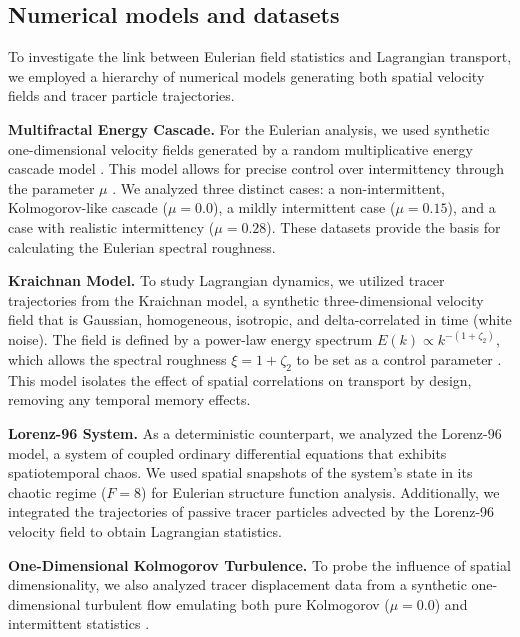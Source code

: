 \documentclass[]{article}
\begin{document}
\subsection{Numerical models and datasets}
To investigate the link between Eulerian field statistics and Lagrangian transport, we employed a hierarchy of numerical models generating both spatial velocity fields and tracer particle trajectories.

\noindent\textbf{Multifractal Energy Cascade.} For the Eulerian analysis, we used synthetic one-dimensional velocity fields generated by a random multiplicative energy cascade model \citep{shivamoggi2022generalizedfractaldimensiondissipative}. This model allows for precise control over intermittency through the parameter $\mu$ \citep{arreola2024currentstateatmosphericturbulence}. We analyzed three distinct cases: a non-intermittent, Kolmogorov-like cascade ($\mu=0.0$), a mildly intermittent case ($\mu=0.15$), and a case with realistic intermittency ($\mu=0.28$). These datasets provide the basis for calculating the Eulerian spectral roughness.

\noindent\textbf{Kraichnan Model.} To study Lagrangian dynamics, we utilized tracer trajectories from the Kraichnan model, a synthetic three-dimensional velocity field that is Gaussian, homogeneous, isotropic, and delta-correlated in time (white noise). The field is defined by a power-law energy spectrum $E(k) \propto k^{-(1+\zeta_2)}$, which allows the spectral roughness $\xi = 1 + \zeta_2$ to be set as a control parameter \citep{considera2025transportmultifractalkraichnanflows}. This model isolates the effect of spatial correlations on transport by design, removing any temporal memory effects.

\noindent\textbf{Lorenz-96 System.} As a deterministic counterpart, we analyzed the Lorenz-96 model, a system of coupled ordinary differential equations that exhibits spatiotemporal chaos. We used spatial snapshots of the system's state in its chaotic regime ($F=8$) for Eulerian structure function analysis. Additionally, we integrated the trajectories of passive tracer particles advected by the Lorenz-96 velocity field to obtain Lagrangian statistics.

\noindent\textbf{One-Dimensional Kolmogorov Turbulence.} To probe the influence of spatial dimensionality, we also analyzed tracer displacement data from a synthetic one-dimensional turbulent flow \citep{benzi199611dimensionalturbulence,kuksin2021kolmogorovstheoryturbulencerigorous} emulating both pure Kolmogorov ($\mu=0.0$) and intermittent statistics \citep{drivas2026mathematicaltheoremsturbulence}.
\end{document}
